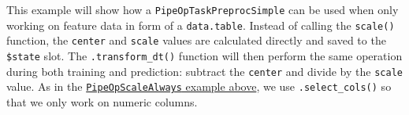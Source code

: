 \documentclass[
]{scrbook}
\newenvironment{Shaded}{\begin{snugshade}}{\end{snugshade}}
\newcommand{\AttributeTok}[1]{\textcolor[rgb]{0.77,0.63,0.00}{#1}}
\newcommand{\ControlFlowTok}[1]{\textcolor[rgb]{0.13,0.29,0.53}{\textbf{#1}}}
\newcommand{\FunctionTok}[1]{\textcolor[rgb]{0.00,0.00,0.00}{#1}}
\newcommand{\NormalTok}[1]{#1}
\newcommand{\OtherTok}[1]{\textcolor[rgb]{0.56,0.35,0.01}{#1}}
\newcommand{\SpecialCharTok}[1]{\textcolor[rgb]{0.00,0.00,0.00}{#1}}
\newcommand{\StringTok}[1]{\textcolor[rgb]{0.31,0.60,0.02}{#1}}
\renewenvironment{Shaded} {\begin{snugshade}\small} {\end{snugshade}}
\begin{document}
This example will show how a \texttt{PipeOpTaskPreprocSimple} can be used when only working on feature data in form of a \texttt{data.table}.
Instead of calling the \texttt{scale()} function, the \texttt{center} and \texttt{scale} values are calculated directly and saved to the \texttt{\$state} slot.
The \texttt{.transform\_dt()} function will then perform the same operation during both training and prediction: subtract the \texttt{center} and divide by the \texttt{scale} value.
As in the \protect\hyperlink{example-pipeopscalealways}{\texttt{PipeOpScaleAlways} example above}, we use \texttt{.select\_cols()} so that we only work on numeric columns.

\begin{Shaded}
\end{Shaded}
\end{document}

